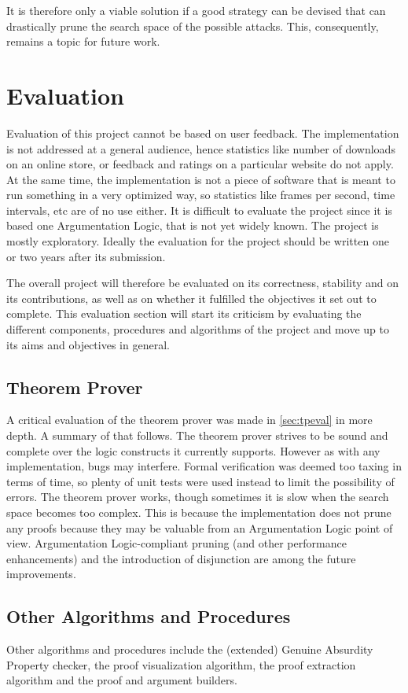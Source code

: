 \documentclass[11pt,twoside,a4paper]{report}
\begin{document}
It is therefore only a viable solution if a good strategy can be devised that can drastically prune the search space of the possible attacks. This, consequently, remains a topic for future work.

\chapter{Evaluation}
\label{chap:eval}
Evaluation of this project cannot be based on user feedback. The implementation is not addressed at a general audience, hence statistics like number of downloads on an online store, or feedback and ratings on a particular website do not apply. At the same time, the implementation is not a piece of software that is meant to run something in a very optimized way, so statistics like frames per second, time intervals, etc are of no use either. It is difficult to evaluate the project since it is based one Argumentation Logic, that is not yet widely known. The project is mostly exploratory. Ideally the evaluation for the project should be written one or two years after its submission.

The overall project will therefore be evaluated on its correctness, stability and on its contributions, as well as on whether it fulfilled the objectives it set out to complete. This evaluation section will start its criticism by evaluating the different components, procedures and algorithms of the project and move up to its aims and objectives in general.

\section{Theorem Prover}
A critical evaluation of the theorem prover was made in \autoref{sec:tpeval} in more depth. A summary of that follows. The theorem prover strives to be sound and complete over the logic constructs it currently supports. However as with any implementation, bugs may interfere. Formal verification was deemed too taxing in terms of time, so plenty of unit tests were used instead to limit the possibility of errors. The theorem prover works, though sometimes it is slow when the search space becomes too complex. This is because the implementation does not prune any proofs because they may be valuable from an Argumentation Logic point of view. Argumentation Logic-compliant pruning (and other performance enhancements) and the introduction of disjunction are among the future improvements.

\section{Other Algorithms and Procedures}
Other algorithms and procedures include the (extended) Genuine Absurdity Property checker, the proof visualization algorithm, the proof extraction algorithm and the proof and argument builders.
\end{document}
